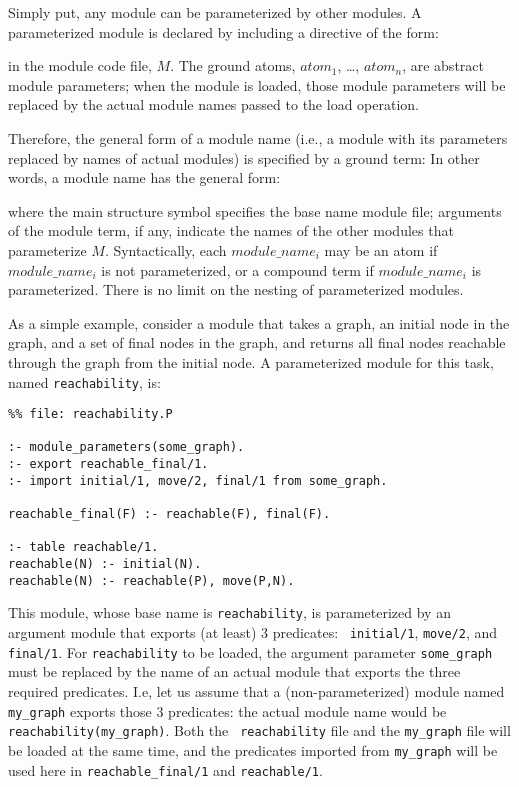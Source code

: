Simply put, any module can be parameterized by other modules.  A
parameterized module is declared by including a directive of the form:


\noindent in the module code file, $M$.  The ground atoms, $atom_1$,
\ldots, $atom_n$, are abstract module parameters; when the module is
loaded, those module parameters will be replaced by the actual module
names passed to the load operation.

Therefore, the general form of a module name (i.e., a module with its
parameters replaced by names of actual modules) is specified by a
ground term: In other words, a module name has the general form:


\noindent
where the main structure symbol specifies the base name module file;
arguments of the module term, if any, indicate the names of the other
modules that parameterize $M$.  Syntactically, each $module\_name_i$
may be an atom if $module\_name_i$ is not parameterized, or a compound
term if $module\_name_i$ is parameterized.  There is no limit on the
nesting of parameterized modules.

As a simple example, consider a module that takes a graph, an initial
node in the graph, and a set of final nodes in the graph, and returns
all final nodes reachable through the graph from the initial node.  A
parameterized module for this task, named {\tt reachability}, is:
\begin{verbatim}
%% file: reachability.P

:- module_parameters(some_graph).
:- export reachable_final/1.
:- import initial/1, move/2, final/1 from some_graph.

reachable_final(F) :- reachable(F), final(F).

:- table reachable/1.
reachable(N) :- initial(N).
reachable(N) :- reachable(P), move(P,N).
\end{verbatim}
This module, whose base name is {\tt reachability}, is parameterized
by an argument module that exports (at least) 3 predicates: {\tt
  initial/1}, {\tt move/2}, and {\tt final/1}.  For {\tt reachability}
to be loaded, the argument parameter {\tt some\_graph} must be
replaced by the name of an actual module that exports the three
required predicates.  I.e, let us assume that a (non-parameterized)
module named {\tt my\_graph} exports those 3 predicates: the actual
module name would be {\tt reachability(my\_graph)}.  Both the {\tt
  reachability} file and the {\tt my\_graph} file will be loaded at the
same time, and the predicates imported from {\tt my\_graph} will be
used here in {\tt reachable\_final/1} and {\tt reachable/1}.

